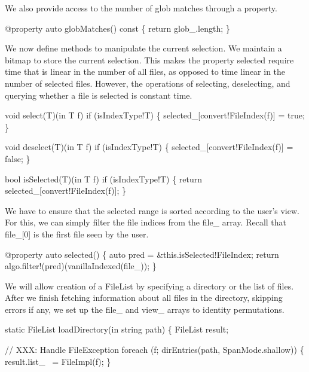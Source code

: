 \nwendcode{}We also provide access to the number of glob matches through a
property.

\nwenddocs{}\plusendmoddef\nwstartdeflinemarkup\nwenddeflinemarkup
@property
auto globMatches() const
\{
  return glob_.length;
\}

\nwendcode{}We now define methods to manipulate the current selection. We
maintain a bitmap to store the current selection. This makes the
property {\Tt{}selected\nwendquote} require time that is linear in the number of all
files, as opposed to time linear in the number of selected
files. However, the operations of selecting, deselecting, and querying
whether a file is selected is constant time.

\nwenddocs{}\plusendmoddef\nwstartdeflinemarkup\nwenddeflinemarkup
void select(T)(in T f) if (isIndexType!T)
\{
  selected_[convert!FileIndex(f)] = true;
\}

void deselect(T)(in T f) if (isIndexType!T)
\{
  selected_[convert!FileIndex(f)] = false;
\}

bool isSelected(T)(in T f) if (isIndexType!T)
\{
  return selected_[convert!FileIndex(f)];
\}

\nwendcode{}We have to ensure that the {\Tt{}selected\nwendquote} range is sorted according to
the user's view. For this, we can simply filter the file indices from
the {\Tt{}file{\_}\nwendquote} array. Recall that {\Tt{}file{\_}[0]\nwendquote} is the first file seen
by the user.

\nwenddocs{}\plusendmoddef\nwstartdeflinemarkup\nwenddeflinemarkup
@property
auto selected()
\{
  auto pred = &this.isSelected!FileIndex;
  return algo.filter!(pred)(vanillaIndexed(file_));
\}

\nwendcode{}We will allow creation of a {\Tt{}FileList\nwendquote} by specifying a directory
or the list of files. After we finish fetching information about all
files in the directory, skipping errors if any, we set up the
{\Tt{}file{\_}\nwendquote} and {\Tt{}view{\_}\nwendquote} arrays to identity permutations.

\nwenddocs{}\endmoddef\nwstartdeflinemarkup\nwenddeflinemarkup
static FileList loadDirectory(in string path)
\{
  FileList result;

  // XXX: Handle FileException
  foreach (f; dirEntries(path, SpanMode.shallow)) \{
    result.list_ ~= FileImpl(f);
  \}

